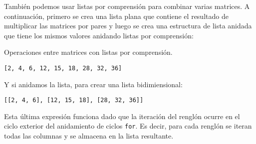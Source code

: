 También podemos usar listas por comprensión para combinar varias
matrices. A continuación, primero se crea una lista plana que contiene
el resultado de multiplicar las matrices por pares y luego se crea una
estructura de lista anidada que tiene los mismos valores anidando listas
por comprensión:\\

\begin{code} Operaciones entre matrices con listas por comprensión.
\begin{Shaded}
\begin{Highlighting}[]
\NormalTok{[M[row][col] }\OperatorTok{*} \NormalTok{(} \NormalTok{(}\NormalTok{(N))]}
\end{Highlighting}
\end{Shaded}

\begin{verbatim}
[2, 4, 6, 12, 15, 18, 28, 32, 36]
\end{verbatim}

Y si anidamos la lista, para crear una lista bidimiensional:

\begin{Shaded}
\begin{Highlighting}[]
\NormalTok{[[M[row][col] }\OperatorTok{*} \NormalTok{(}\NormalTok{(M))] } \NormalTok{(}\NormalTok{(N))]}
\end{Highlighting}
\end{Shaded}

\begin{verbatim}
[[2, 4, 6], [12, 15, 18], [28, 32, 36]]
\end{verbatim}
\end{code}

Esta última expresión funciona dado que la iteración del renglón ocurre
en el ciclo exterior del anidamiento de ciclos \texttt{for}. Es decir,
para cada renglón se iteran todas las columnas y se almacena en la lista
resultante.
\\

